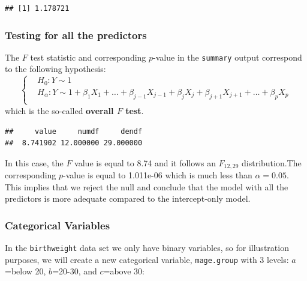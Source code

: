 \documentclass[
]{book}
\newenvironment{Shaded}{\begin{snugshade}}{\end{snugshade}}
\newcommand{\FunctionTok}[1]{\textcolor[rgb]{0.13,0.29,0.53}{\textbf{#1}}}
\newcommand{\NormalTok}[1]{#1}
\newcommand{\SpecialCharTok}[1]{\textcolor[rgb]{0.81,0.36,0.00}{\textbf{#1}}}
\begin{document}
\begin{verbatim}
## [1] 1.178721
\end{verbatim}

\subsubsection{Testing for all the predictors}\label{testing-for-all-the-predictors}

The \(F\) test statistic and corresponding \(p\)-value in the \texttt{summary} output correspond to the following hypothesis:
\[\begin{cases}
 &H_0: Y \sim  1 \\
 & H_{\alpha}:  Y \sim  1+  \beta_1 X_1 + \ldots + \beta_{j-1}X_{j-1} +  \beta_{j} X_{j} + \beta_{j+1} X_{j+1} + \ldots + \beta_p X_p \\
 \end{cases} 
 \]
which is the so-called \textbf{overall \(F\) test}.

\begin{Shaded}
\end{Shaded}

\begin{verbatim}
##     value     numdf     dendf 
##  8.741902 12.000000 29.000000
\end{verbatim}

In this case, the \(F\) value is equal to 8.74 and it follows an \(F_{12, 29}\) distribution.The corresponding \(p\)-value is equal to 1.011e-06 which is much less than \(\alpha=0.05\). This implies that we reject the null and conclude that the model with all the predictors is more adequate compared to the intercept-only model.

\subsubsection{Categorical Variables}\label{categorical-variables}

In the \texttt{birthweight} data set we only have binary variables, so for illustration purposes, we will create a new categorical variable, \texttt{mage.group} with 3 levels: \(a\)=below 20, \(b\)=20-30, and \(c\)=above 30:
\end{document}
